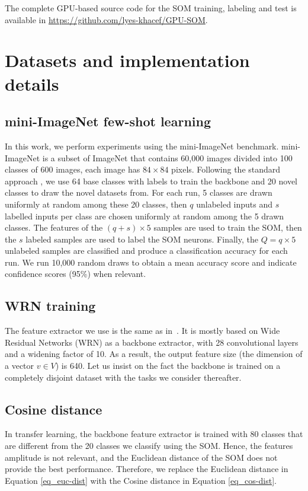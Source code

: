 \documentclass[runningheads]{llncs}
\begin{document}
The complete GPU-based source code for the SOM training, labeling and test is available in \url{https://github.com/lyes-khacef/GPU-SOM}.



\section{Datasets and implementation details}
\label{sec_methods}
\subsection{mini-ImageNet few-shot learning}

In this work, we perform experiments using the mini-ImageNet \cite{vinyals2016imgnet} benchmark. mini-ImageNet is a subset of ImageNet \cite{russakovsky2015imgnet} that contains 60,000 images divided into 100 classes of 600 images, each image has $84\times84$ pixels. Following the standard approach \cite{ravi2017optimization_few_shot}, we use 64 base classes with labels to train the backbone and 20 novel classes to draw the novel datasets from. For each run, 5 classes are drawn uniformly at random among these 20 classes, then $q$ unlabeled inputs and $s$ labelled inputs per class are chosen uniformly at random among the 5 drawn classes. The features of the $(q+s)\times5$ samples are used to train the SOM, then the $s$ labeled samples are used to label the SOM neurons. Finally, the $Q=q\times5$ unlabeled samples are classified and produce a classification accuracy for each run. We run 10,000 random draws to obtain a mean accuracy score and indicate confidence scores (95\%) when relevant.

\subsection{WRN training}

The feature extractor we use is the same as in~\cite{hu2020accurate_few_shot}. It is mostly based on Wide Residual Networks (WRN) \cite{zagoruyko2016wrn} as a backbone extractor, with 28 convolutional layers and a widening factor of 10. As a result, the output feature size (the dimension of a vector $v\in V$) is 640. Let us insist on the fact the backbone is trained on a completely disjoint dataset with the tasks we consider thereafter.

\subsection{Cosine distance}
In transfer learning, the backbone feature extractor is trained with 80 classes that are different from the 20 classes we classify using the SOM. Hence, the features amplitude is not relevant, and the Euclidean distance of the SOM does not provide the best performance. Therefore, we replace the Euclidean distance in Equation \ref{eq_euc-dist} with the Cosine distance in Equation \ref{eq_cos-dist}.
\end{document}
